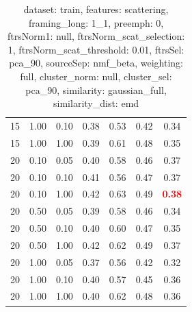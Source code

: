 \begin{table}
\begin{center}
\begin{tabular}{lllcccc}
15 & 1.00 & 0.10 & 0.38 & 0.53 & 0.42 & 0.34 \\ 
15 & 1.00 & 1.00 & 0.39 & 0.61 & 0.48 & 0.35 \\ 
20 & 0.10 & 0.05 & 0.40 & 0.58 & 0.46 & 0.37 \\ 
20 & 0.10 & 0.10 & 0.41 & 0.56 & 0.47 & 0.37 \\ 
20 & 0.10 & 1.00 & 0.42 & 0.63 & 0.49 & \textbf{\textcolor{red}{0.38}} \\ 
20 & 0.50 & 0.05 & 0.39 & 0.58 & 0.46 & 0.34 \\ 
20 & 0.50 & 0.10 & 0.40 & 0.60 & 0.47 & 0.35 \\ 
20 & 0.50 & 1.00 & 0.42 & 0.62 & 0.49 & 0.37 \\ 
20 & 1.00 & 0.05 & 0.37 & 0.56 & 0.42 & 0.32 \\ 
20 & 1.00 & 0.10 & 0.40 & 0.57 & 0.45 & 0.36 \\ 
20 & 1.00 & 1.00 & 0.40 & 0.62 & 0.48 & 0.36 \\ 
\end{tabular} 
\end{center} 
\caption{dataset: train, features: scattering, framing\_long: 1\_1, preemph: 0, ftrsNorm1: null, ftrsNorm\_scat\_selection: 1, ftrsNorm\_scat\_threshold: 0.01, ftrsSel: pca\_90, sourceSep: nmf\_beta, weighting: full, cluster\_norm: null, cluster\_sel: pca\_90, similarity: gaussian\_full, similarity\_dist: emd} 
\label{datasetrFeaturscFraminlong1_1Preemp0Ftrsnorm1nuFtrsnoscatselect1Ftrsnoscatthresh0.01Ftrsselpc90SourcesepnmbeWeightfuClustenormnuClusteselpc90SimilagafuSimiladistem} 
\end{table} 
 
